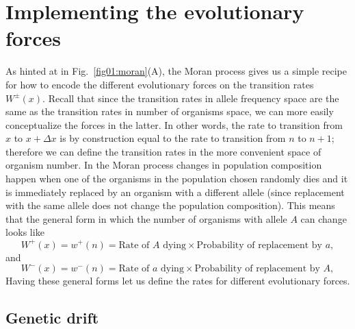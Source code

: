 \section{Implementing the evolutionary forces}

As hinted at in Fig.~\ref{fig01:moran}(A), the Moran process gives us a simple
recipe for how to encode the different evolutionary forces on the transition
rates $W^\pm(x)$. Recall that since the transition rates in allele frequency
space are the same as the transition rates in number of organisms space, we can
more easily conceptualize the forces in the latter. In other words, the rate to
transition from $x$ to $x + \Delta x$ is by construction equal to the rate to
transition from $n$ to $n + 1$; therefore we can define the transition rates in
the more convenient space of organism number. In the Moran process changes in
population composition happen when one of the organisms in the population chosen
randomly dies and it is immediately replaced by an organism with a different
allele (since replacement with the same allele does not change the population
composition). This means that the general form in which the number of organisms
with allele $A$ can change looks like
\begin{equation}
    W^+(x) = w^+(n) = 
    \text{Rate of $A$ dying} \times
    \text{Probability of replacement by $a$},
\end{equation}
and 
\begin{equation}
    W^-(x) = w^-(n) = 
    \text{Rate of $a$ dying} \times
    \text{Probability of replacement by $A$},
\end{equation}
Having these general forms let us define the rates for different evolutionary
forces.

\subsection{Genetic drift}

